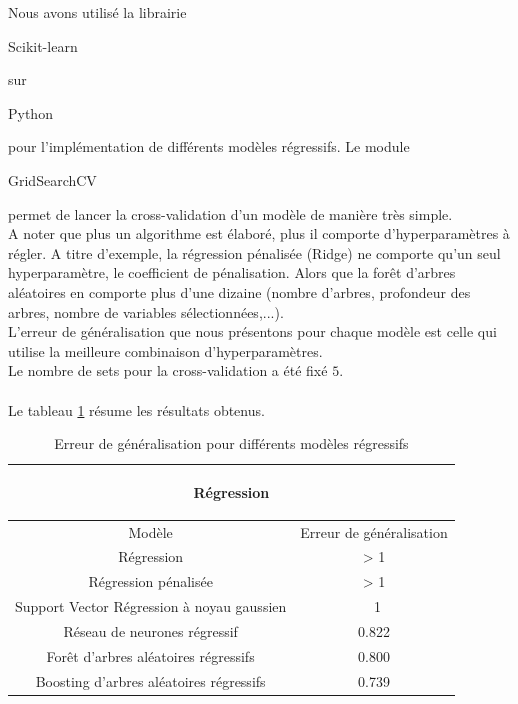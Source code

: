 \documentclass{book}
\begin{document}
Nous avons utilisé la librairie \begin{itshape}Scikit-learn\end{itshape}\cite{scikit-learn} sur \begin{itshape}Python\end{itshape} 
pour l'implémentation de différents modèles régressifs. Le module \begin{itshape}GridSearchCV\end{itshape} permet de lancer
la cross-validation d'un modèle de manière très simple.\\
A noter que plus un algorithme est élaboré, plus il comporte d'hyperparamètres à régler. A titre d'exemple, la régression pénalisée (Ridge)
ne comporte qu'un seul hyperparamètre, le coefficient de pénalisation. Alors que la for\^{e}t d'arbres aléatoires en comporte plus d'une dizaine
(nombre d'arbres, profondeur des arbres, nombre de variables sélectionnées,...).\\
L'erreur de généralisation que nous présentons pour chaque modèle 
est celle qui utilise la meilleure combinaison d'hyperparamètres.\\
Le nombre de sets pour la cross-validation a été fixé $5$.\\
\\
Le tableau \ref{regression_resultats} résume les résultats obtenus.
\begin{table}[H]
\begin{center}
\begin{adjustbox}{max width=\textwidth}
\begin{tabular}{|c|c|}
\hline
\multicolumn{2}{|c|}{\begin{bf}Régression\end{bf}} \\
\hline 
Modèle & Erreur de généralisation \\
\hline 
Régression & > 1\\
\hline 
Régression pénalisée & > 1 \\
\hline 
Support Vector Régression à noyau gaussien & ~1 \\
\hline
Réseau de neurones régressif & 0.822\\
\hline
For\^{e}t d'arbres aléatoires régressifs & 0.800\\
\hline
Boosting d'arbres aléatoires régressifs & 0.739\\
\hline
\end{tabular}
\end{adjustbox}
\end{center}
\caption{Erreur de généralisation pour différents modèles régressifs}
\label{regression_resultats}
\end{table}
\end{document}
